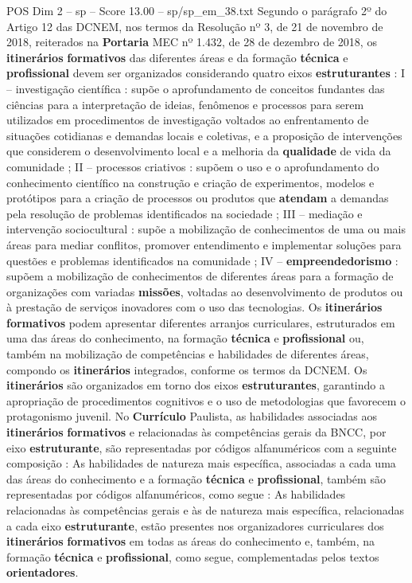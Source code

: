 \begin{textsample}{POS Dim 2 – sp – Score 13.00 – sp/sp\_em\_38.txt}
Segundo o parágrafo 2º do Artigo 12 das DCNEM, nos termos da Resolução nº 3, de 21 de novembro de 2018, reiterados na \textbf{Portaria} MEC nº 1.432, de 28 de dezembro de 2018, os \textbf{itinerários} \textbf{formativos} das diferentes áreas e da formação \textbf{técnica} e \textbf{profissional} devem ser organizados considerando quatro eixos \textbf{estruturantes} : I – investigação científica : supõe o aprofundamento de conceitos fundantes das ciências para a interpretação de ideias, fenômenos e processos para serem utilizados em procedimentos de investigação voltados ao enfrentamento de situações cotidianas e demandas locais e coletivas, e a proposição de intervenções que considerem o desenvolvimento local e a melhoria da \textbf{qualidade} de vida da comunidade ; II – processos criativos : supõem o uso e o aprofundamento do conhecimento científico na construção e criação de experimentos, modelos e protótipos para a criação de processos ou produtos que \textbf{atendam} a demandas pela resolução de problemas identificados na sociedade ; III – mediação e intervenção sociocultural : supõe a mobilização de conhecimentos de uma ou mais áreas para mediar conflitos, promover entendimento e implementar soluções para questões e problemas identificados na comunidade ; IV – \textbf{empreendedorismo} : supõem a mobilização de conhecimentos de diferentes áreas para a formação de organizações com variadas \textbf{missões}, voltadas ao desenvolvimento de produtos ou à prestação de serviços inovadores com o uso das tecnologias.
Os \textbf{itinerários} \textbf{formativos} podem apresentar diferentes arranjos curriculares, estruturados em uma das áreas do conhecimento, na formação \textbf{técnica} e \textbf{profissional} ou, também na mobilização de competências e habilidades de diferentes áreas, compondo os \textbf{itinerários} integrados, conforme os termos da DCNEM.
Os \textbf{itinerários} são organizados em torno dos eixos \textbf{estruturantes}, garantindo a apropriação de procedimentos cognitivos e o uso de metodologias que favorecem o protagonismo juvenil.
No \textbf{Currículo} Paulista, as habilidades associadas aos \textbf{itinerários} \textbf{formativos} e relacionadas às competências gerais da BNCC, por eixo \textbf{estruturante}, são representadas por códigos alfanuméricos com a seguinte composição : As habilidades de natureza mais específica, associadas a cada uma das áreas do conhecimento e a formação \textbf{técnica} e \textbf{profissional}, também são representadas por códigos alfanuméricos, como segue : As habilidades relacionadas às competências gerais e às de natureza mais específica, relacionadas a cada eixo \textbf{estruturante}, estão presentes nos organizadores curriculares dos \textbf{itinerários} \textbf{formativos} em todas as áreas do conhecimento e, também, na formação \textbf{técnica} e \textbf{profissional}, como segue, complementadas pelos textos \textbf{orientadores}.

\end{textsample}
